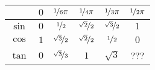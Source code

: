\documentclass[12pt]{article}
\begin{document}
\begin{tabular}{c|ccccc}
	&
	$0$ &
	$\nicefrac{1}{6} \pi$ &
	$\nicefrac{1}{4} \pi$ &
	$\nicefrac{1}{3} \pi$ &
	$\nicefrac{1}{2} \pi$ \\
	\hline

	$\sin$ &
	$0$ &
	$ \nicefrac{1}{2} $ &
	$ \nicefrac{\sqrt{2}}{2} $ &
	$ \nicefrac{\sqrt{3}}{2} $ &
	$1$ \\

	$\cos$ &
	$1$ &
	$ \nicefrac{\sqrt{3}}{2} $ &
	$ \nicefrac{\sqrt{2}}{2} $ &
	$ \nicefrac{1}{2} $ &
	$0$ \\
	
	$\tan$ &
	$0$ &
	$ \nicefrac{\sqrt{3}}{3} $ &
	$ 1 $ &
	$ \sqrt{3} $ &
	??? \\
	
\end{tabular}
\end{document}
